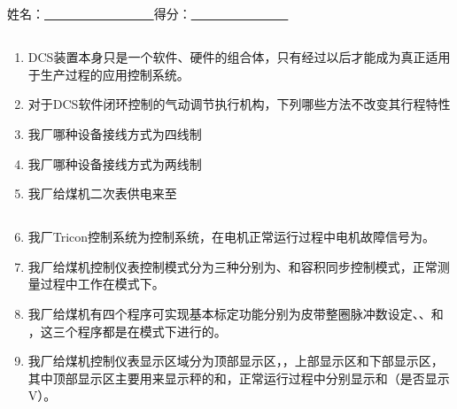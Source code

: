 \documentclass{book}
\begin{document}
		\else						%
		\fi						%
\chapter[2023年12月份技术培训考试]{	\hspace*{-0.3em}}
姓名：\uline{ \ \  \  \ \ \ \ \ \ \ \ \ \ \ \ \ \ }\hfill 得分：\uline{ \ \  \  \ \ \ \ \ \  \ \ \ \ \ \ }
\section{}
\begin{enumerate}
\item DCS装置本身只是一个软件、硬件的组合体，只有经过以后才能成为真正适用于生产过程的应用控制系统。
\item 对于DCS软件闭环控制的气动调节执行机构，下列哪些方法不改变其行程特性

\item 我厂哪种设备接线方式为四线制

\item 我厂哪种设备接线方式为两线制

\item 我厂给煤机二次表供电来至
\end{enumerate}
\section{}
\begin{enumerate}
	\setcounter{enumi}{5}
	\item 我厂Tricon控制系统为控制系统，在电机正常运行过程中电机故障信号为。
\item 我厂给煤机控制仪表控制模式分为三种分别为、和容积同步控制模式，正常测量过程中工作在模式下。
\item 我厂给煤机有四个程序可实现基本标定功能分别为皮带整圈脉冲数设定、、和\\ ，这三个程序都是在模式下进行的。
	\item 我厂给煤机控制仪表显示区域分为顶部显示区，，上部显示区和下部显示区，其中顶部显示区主要用来显示秤的和，正常运行过程中分别显示和（是否显示V）。

\end{enumerate}
\end{document}
